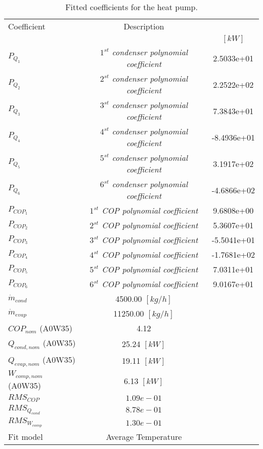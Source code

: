 \documentclass[english]{SPFShortReport}
\author{Dani Carbonell}
\begin{document}
\begin{table}[!ht]
\begin{small}
\caption{Fitted coefficients for the heat pump.}
\begin{center}
\resizebox{12cm}{!} 
{
\begin{tabular}{l | c c } 
\hline
\hline
Coefficient &Description & \\ 
 & &$[kW]$\\ 
\hline
$P_{Q_{1}}$ & \emph{$1^{st}$ condenser polynomial coefficient}  & 2.5033e+01    \\ 
$P_{Q_{2}}$ & \emph{$2^{st}$ condenser polynomial coefficient}  & 2.2522e+02    \\ 
$P_{Q_{3}}$ & \emph{$3^{st}$ condenser polynomial coefficient}  & 7.3843e+01    \\ 
$P_{Q_{4}}$ & \emph{$4^{st}$ condenser polynomial coefficient}  & -8.4936e+01    \\ 
$P_{Q_{5}}$ & \emph{$5^{st}$ condenser polynomial coefficient}  & 3.1917e+02    \\ 
$P_{Q_{6}}$ & \emph{$6^{st}$ condenser polynomial coefficient}  & -4.6866e+02    \\ 
\hline
$P_{COP_{1}}$ & \emph{$1^{st}$ COP polynomial coefficient}  & 9.6808e+00    \\ 
$P_{COP_{2}}$ & \emph{$2^{st}$ COP polynomial coefficient}  & 5.3607e+01    \\ 
$P_{COP_{3}}$ & \emph{$3^{st}$ COP polynomial coefficient}  & -5.5041e+01    \\ 
$P_{COP_{4}}$ & \emph{$4^{st}$ COP polynomial coefficient}  & -1.7681e+02    \\ 
$P_{COP_{5}}$ & \emph{$5^{st}$ COP polynomial coefficient}  & 7.0311e+01    \\ 
$P_{COP_{6}}$ & \emph{$6^{st}$ COP polynomial coefficient}  & 9.0167e+01    \\ 
\hline
$\dot m_{cond}$ & 4500.00 $[kg/h]$ \\ 
$\dot m_{evap}$ & 11250.00 $[kg/h]$ \\ 
\hline
$COP_{nom}$ (A0W35)& 4.12 \\ 
$Q_{cond,nom}$ (A0W35)& 25.24 $[kW]$\\ 
$Q_{evap,nom}$ (A0W35)& 19.11 $[kW]$\\ 
$W_{comp,nom}$ (A0W35)& 6.13 $[kW]$\\ 
\hline
 $RMS_{COP}$ & $1.09e-01$ \\ 
 $RMS_{Q_{cond}}$ & $8.78e-01$ \\ 
 $RMS_{W_{comp}}$ & $1.30e-01$ \\ 
\hline
Fit model & Average Temperature\\ 
\hline
\hline
\end{tabular}
}
\label{CoefTable}
\end{center}
\end{small}
\end{table}
\end{document}
